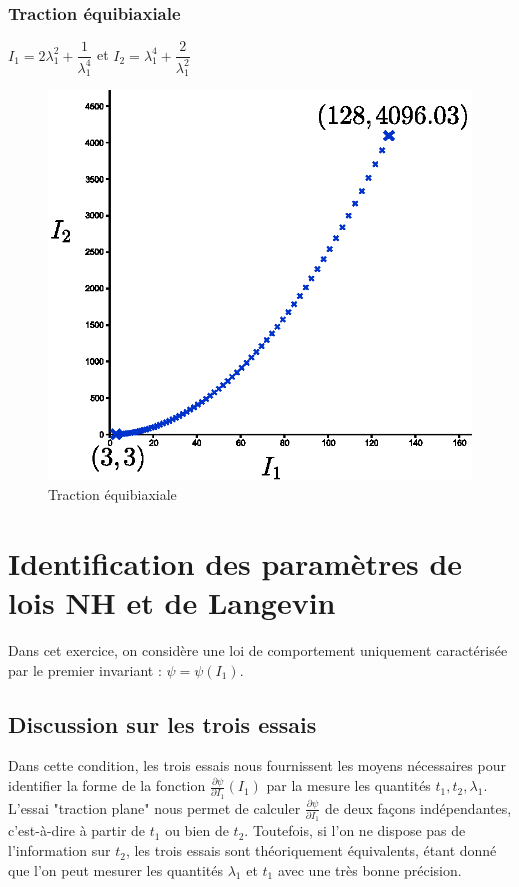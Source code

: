 \documentclass[a4paper,11pt]{article}
\begin{document}
\newpage
\subsubsection{Traction équibiaxiale}
$I_1=2\lambda_1^2+\dfrac{1}{\lambda_1^4}$ et $I_2=\lambda_1^4+\dfrac{2}{\lambda_1^2}$

\begin{figure}[!ht]
\centering\includegraphics[scale=0.8]{scilab/q2-6-3.eps}
\caption{Traction équibiaxiale}
\label{fig:tract_equi}
\end{figure}

\section{Identification des paramètres de lois NH et de Langevin}

Dans cet exercice, on considère une loi de comportement uniquement caractérisée par le premier invariant : $\psi = \psi(I_1)$.

\subsection {Discussion sur les trois essais}

Dans cette condition, les trois essais nous fournissent les moyens nécessaires pour identifier la forme de la fonction $\frac{\partial\psi}{\partial I_1} (I_1)$ par la mesure les quantités $t_1, t_2, \lambda_1$. L'essai "traction plane" nous permet de calculer $\frac{\partial\psi}{\partial I_1}$ de deux façons indépendantes, c'est-à-dire à partir de $t_1$ ou bien de $t_2$. Toutefois, si l'on ne dispose pas de l'information sur $t_2$, les trois essais sont théoriquement équivalents, étant donné que l'on peut mesurer les quantités $\lambda_1$ et $t_1$ avec une très bonne précision.
\end{document}
